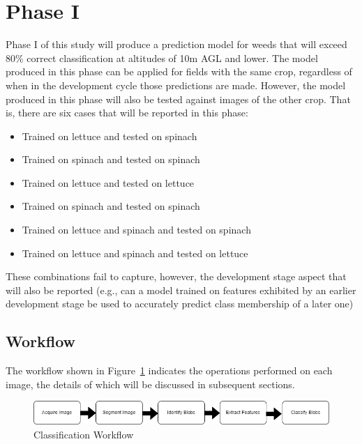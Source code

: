 \documentclass[12pt]{article}
\begin{document}
\section{Phase I}
Phase I of this study will produce a prediction model for weeds that will exceed 80\% correct classification at altitudes of 10m AGL and lower. The model produced in this phase can be applied for fields with the same crop, regardless of when in the development cycle those predictions are made. However, the model produced in this phase will also be tested against images of the other crop. That is, there are six cases that will be reported in this phase:
\begin{itemize}
	\item{Trained on lettuce and tested on spinach}
	\item{Trained on spinach and tested on spinach}
	\item{Trained on lettuce and tested on lettuce}
	\item{Trained on spinach and tested on spinach}
	\item{Trained on lettuce and spinach and tested on spinach}
	\item{Trained on lettuce and spinach and tested on lettuce}
\end{itemize}
These combinations fail to capture, however, the development stage aspect that will also be reported (e.g., can a model trained on features exhibited by an earlier development stage be used to accurately predict class membership of a later one)





\subsection{Workflow}
The workflow shown in Figure~\ref{fig:workflow} indicates the operations performed on each image, the details of which will be discussed in subsequent sections.
\begin{figure}[h!]
	\centering
	\includegraphics[width=0.8\linewidth]{./figures/workflow.drawio.png}
	\caption[Classification Workflow]{Classification Workflow}
	\label{fig:workflow}
\end{figure}
\end{document}
